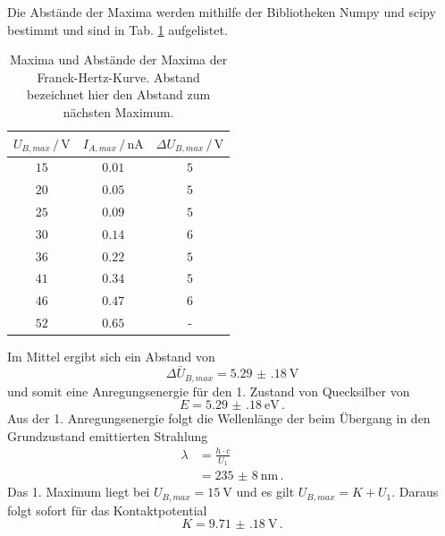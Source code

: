 \FloatBarrier
Die Abstände der Maxima werden mithilfe der Bibliotheken Numpy\cite{numpy} und scipy\cite{scipy} bestimmt und sind in Tab. \ref{tab:abstand} aufgelistet.
\begin{table}
    \centering
    \begin{tabular}{ccc}
        \toprule
        $U_{B,max} \,/\, \si{\volt}$ & $I_{A,max} \,/\, \si{\nano\ampere}$ & $\Delta U_{B,max} \,/\, \si{\volt} $ \\
        \midrule
        $15$ & $0.01$ & $5$ \\
        $20$ & $0.05$ & $5$ \\
        $25$ & $0.09$ & $5$ \\
        $30$ & $0.14$ & $6$ \\
        $36$ & $0.22$ & $5$ \\
        $41$ & $0.34$ & $5$ \\
        $46$ & $0.47$ & $6$ \\
        $52$ & $0.65$ & - \\
        \bottomrule
    \end{tabular}
    \caption{Maxima und Abstände der Maxima der Franck-Hertz-Kurve. Abstand bezeichnet hier den Abstand zum nächsten Maximum.}
    \label{tab:abstand}
\end{table}
Im Mittel ergibt sich ein Abstand von
\begin{equation*}
    \Delta \bar{U}_{B,max} = \SI{5.29(18)}{\volt}
\end{equation*}
und somit eine Anregungsenergie für den 1. Zustand von Quecksilber von
\begin{equation}
    E = \SI{5.29(18)}{\electronvolt} \, .
\end{equation}
Aus der 1. Anregungsenergie folgt die Wellenlänge der beim Übergang in den Grundzustand emittierten Strahlung
\begin{align*}
    \lambda &= \frac{h \cdot c}{U_1} \\
    &= \SI{235(8)}{\nano\metre} \, .
\end{align*}
Das 1. Maximum liegt bei $U_{B,max}=\SI{15}{\volt}$ und es gilt $U_{B,max} = K + U_1$.
Daraus folgt sofort für das Kontaktpotential
\begin{equation}
    K = \SI{9.71(18)}{\volt} \, .
\end{equation}